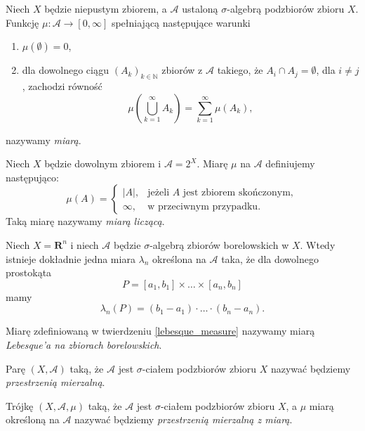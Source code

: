 	\begin{df}
		Niech $X$ będzie niepustym zbiorem, a $\mathcal{A}$ ustaloną $\sigma$-algebrą podzbiorów zbioru $X$. Funkcję $\mu:\mathcal{A} \rightarrow [0, \infty]$ spełniającą następujące warunki
			\begin{enumerate}
				\item $\mu(\emptyset) = 0$,
				\item dla dowolnego ciągu $(A_k)_{k \in \mathbb{N}}$ zbiorów z $\mathcal{A}$ takiego, że $A_i \cap A_j = \emptyset$, dla $i \neq j$, zachodzi równość
				\begin{equation}
				\mu \left( \bigcup_{k=1}^{\infty} A_k \right) = \sum_{k=1}^{\infty} \mu(A_k), 
				\end{equation}
			\end{enumerate}
		nazywamy \textit{miarą}. 
	\end{df}
	
	\begin{przyk}
		Niech $X$ będzie dowolnym zbiorem i $\mathcal{A} = 2^X$. Miarę $\mu$ na $\mathcal{A}$ definiujemy następująco:		
		\[
		\mu(A) =
		\begin{cases}
			|A|, &\text{jeżeli $A$ jest zbiorem skończonym}, \\
			\infty, & \text{w przeciwnym przypadku}.
			\end{cases}
		\]
		Taką miarę nazywamy \textit{miarą liczącą}.
	\end{przyk}
	
	\begin{tw}\label{lebesque_measure}
		Niech $X = \textbf{R}^n$ i niech $\mathcal{A}$ będzie $\sigma$-algebrą zbiorów borelowskich w $X$. Wtedy istnieje dokładnie jedna miara $\lambda_n$ określona na $\mathcal{A}$ taka, że dla dowolnego prostokąta 
		$$
			P = [a_1,b_1]\times \ldots \times [a_n, b_n]
		$$
		mamy 
		$$
		\lambda_n(P) = (b_1 - a_1) \cdot \ldots \cdot (b_n - a_n).
		$$
	\end{tw}
	
	\begin{df}
		Miarę zdefiniowaną w twierdzeniu \ref{lebesque_measure} nazywamy miarą \textit{Lebesque'a na zbiorach borelowskich}.
	\end{df}
	
	\begin{df}
		Parę $(X, \mathcal{A})$ taką, że $\mathcal{A}$ jest $\sigma$-ciałem podzbiorów zbioru $X$ nazywać będziemy \textit{przestrzenią mierzalną}.
	\end{df}
	
	\begin{df}
		Trójkę $(X, \mathcal{A}, \mu)$ taką, że $\mathcal{A}$ jest $\sigma$-ciałem podzbiorów zbioru $X$, a $\mu$ miarą określoną na $\mathcal{A}$ nazywać będziemy \textit{przestrzenią mierzalną z miarą}.
	\end{df}
	
